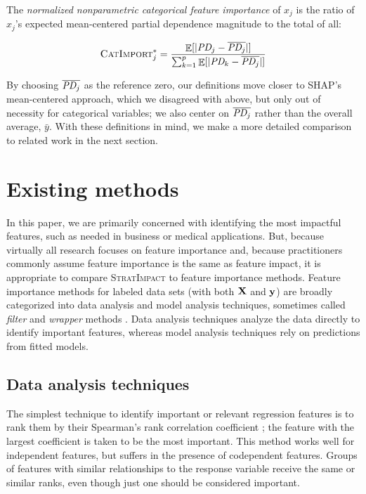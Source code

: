 \documentclass[11pt]{article}
\DeclareMathOperator{\Ex}{\mathbb{E}}
\newcommand{\CImpo}{\fontfamily{cmr}\textsc{CatImport}}
\newcommand{\simp}{\fontfamily{cmr}\textsc{\small StratImpact}}
\begin{document}
 The {\em normalized nonparametric categorical feature importance} of $x_j$ is the ratio of $x_j$'s expected mean-centered partial dependence magnitude to the total of all:

\begin{equation}\label{eq:Epd2b}
\CImpo_j^{*} = \frac{\Ex[|\text{\it PD}_j - \overline{\text{\it PD}_j}|]}{\sum_{k=1}^p \Ex[|\text{\it PD}_k - \overline{\text{\it PD}_j}|]}
\end{equation}

By choosing $\overline{\text{\it PD}_j}$ as the reference zero, our definitions move closer to SHAP's mean-centered approach, which we disagreed with above, but only out of necessity for categorical variables; we also center on $\overline{\text{\it PD}_j}$ rather than the overall average, $\bar{y}$. With these definitions in mind, we make a more detailed comparison to related work in the next section.

\section{Existing methods}\label{sec:existing}

In this paper, we are primarily concerned with identifying the most impactful features, such as needed in business or medical applications. But, because virtually all research focuses on feature importance and, because practitioners commonly assume feature importance is the same as feature impact, it is appropriate to compare \simp{} to  feature importance methods. Feature importance methods for labeled data sets (with both $\bf X$ and $\bf y$) are broadly categorized into data analysis and model analysis techniques, sometimes called {\em filter} and {\em wrapper} methods \citep{tsanas}. Data analysis techniques analyze the data directly to identify important features, whereas model analysis techniques rely on predictions from fitted models.

\subsection{Data analysis techniques}

The simplest technique to identify important or relevant regression features is to rank them by their Spearman's rank correlation coefficient \citep{spearmans}; the feature with the largest coefficient is taken to be the most important. This method works well for independent features, but suffers in the presence of codependent features.   Groups of features with similar relationships to the response variable receive the same or similar ranks, even though just one should be considered important.
\end{document}
